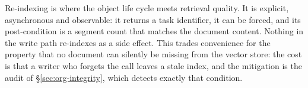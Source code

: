 Re-indexing is where the object life cycle meets retrieval quality. It is
explicit, asynchronous and observable: it returns a task identifier, it can
be forced, and its post-condition is a segment count that matches the
document content. Nothing in the write path re-indexes as a side effect.
This trades convenience for the property that no document can silently be
missing from the vector store: the cost is that a writer who forgets the
call leaves a stale index, and the mitigation is the audit of
\S\ref{sec:org-integrity}, which detects exactly that condition.
